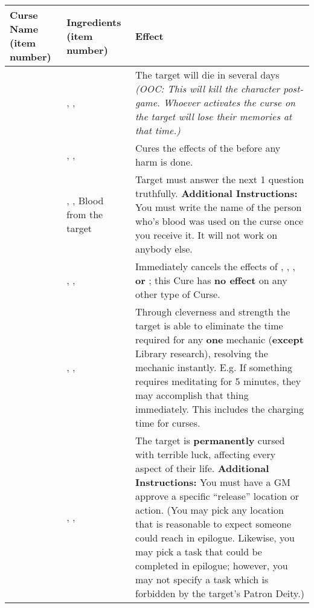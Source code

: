 \documentclass[green]{GL2020}
\begin{document}
\begin{tabularx}{\textwidth}{| >{\centering\arraybackslash} m{2.5cm} | >{\centering\arraybackslash} m{5.5cm} | X |}
\hline
	\textbf{Curse Name (item number)} & \textbf{Ingredients (item number)}  & \textbf{Effect} \\
\hline
\hline
	\iSlowActingPoison{}	&	\iWeakness{}, \iRestraint{}, \iFish{} & The target will die in several days \emph{(OOC: This will kill the character post-game. Whoever activates the curse on the target will lose their memories at that time.)}\\
\hline	
	\iSlowActingPoisonCure{}	&	\iCourage{}, \iLily{}, \iStoneFlower{} & Cures the effects of the \iSlowActingPoison{} before any harm is done. \\
\hline	
	\iHonesty{}	&	\iInsight{}, \iHollyhock{}, Blood from the target & Target must answer the next 1 question truthfully. \textbf{Additional Instructions: } You must write the name of the person who's blood was used on the curse once you receive it. It will not work on anybody else.\\
\hline	
	\iSight{}	&	\iFlameOrchid{}, \iEagleFeather{}, \iHollyhock{} & Immediately cancels the effects of \iBlindness{}, \iRestraint{}, \iBabble{}, \textbf{or} \iWeakness{}; this Cure has \textbf{no effect} on any other type of Curse.\\
\hline	
	\iSkill{}	&	\iStrength{}, \iBlackCrocus{}, \iLimestone{} & Through cleverness and strength the target is able to eliminate the time required for any \textbf{one} mechanic (\textbf{except} Library research), resolving the mechanic instantly. E.g. If something requires meditating for 5 minutes, they may accomplish that thing immediately. This includes the charging time for curses.\\
\hline	
	\iBadLuckCurse{}	&	\iWeakness{}, \iBabble{}, \iCharcoal{} & The target is \textbf{permanently} cursed with terrible luck, affecting every aspect of their life. \textbf{Additional Instructions:} You must have a GM approve a specific ``release'' location or action. (You may pick any location that is reasonable to expect someone could reach in epilogue. Likewise, you may pick a task that could be completed in epilogue; however, you may not specify a task which is forbidden by the target’s Patron Deity.) \\
\hline	
\end{tabularx}
\end{document}
